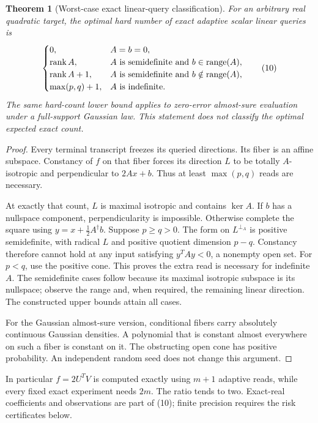 \documentclass[11pt,a4paper]{article}
\newtheorem{theorem}{Theorem}\newtheorem{lemma}[theorem]{Lemma}
\begin{document}
\begin{theorem}[Worst-case exact linear-query classification]
For an arbitrary real quadratic target, the optimal hard number of exact adaptive scalar linear queries is
\[
 \begin{cases}
 0,& A=b=0,\\
 \operatorname{rank} A,& A\text{ is semidefinite and }b\in\operatorname{range}(A),\\
 \operatorname{rank} A+1,& A\text{ is semidefinite and }b\notin\operatorname{range}(A),\\
 \max(p,q)+1,& A\text{ is indefinite}.
 \end{cases} \tag{10}
\]
The same hard-count lower bound applies to zero-error almost-sure evaluation under a full-support Gaussian law. This statement does not classify the optimal expected exact count.
\end{theorem}
\begin{proof}
Every terminal transcript freezes its queried directions. Its fiber is an affine subspace. Constancy of $f$ on that fiber forces its direction $L$ to be totally $A$-isotropic and perpendicular to $2Ax+b$. Thus at least $\max(p,q)$ reads are necessary.

At exactly that count, $L$ is maximal isotropic and contains $\ker A$. If $b$ has a nullspace component, perpendicularity is impossible. Otherwise complete the square using $y=x+\tfrac12 A^\dagger b$. Suppose $p\ge q>0$. The form on $L^{\perp_A}$ is positive semidefinite, with radical $L$ and positive quotient dimension $p-q$. Constancy therefore cannot hold at any input satisfying $y^TAy<0$, a nonempty open set. For $p<q$, use the positive cone. This proves the extra read is necessary for indefinite $A$. The semidefinite cases follow because its maximal isotropic subspace is its nullspace; observe the range and, when required, the remaining linear direction. The constructed upper bounds attain all cases.

For the Gaussian almost-sure version, conditional fibers carry absolutely continuous Gaussian densities. A polynomial that is constant almost everywhere on such a fiber is constant on it. The obstructing open cone has positive probability. An independent random seed does not change this argument.
\end{proof}

In particular $f=2U^TV$ is computed exactly using $m+1$ adaptive reads, while every fixed exact experiment needs $2m$. The ratio tends to two. Exact-real coefficients and observations are part of (10); finite precision requires the risk certificates below.
\end{document}
